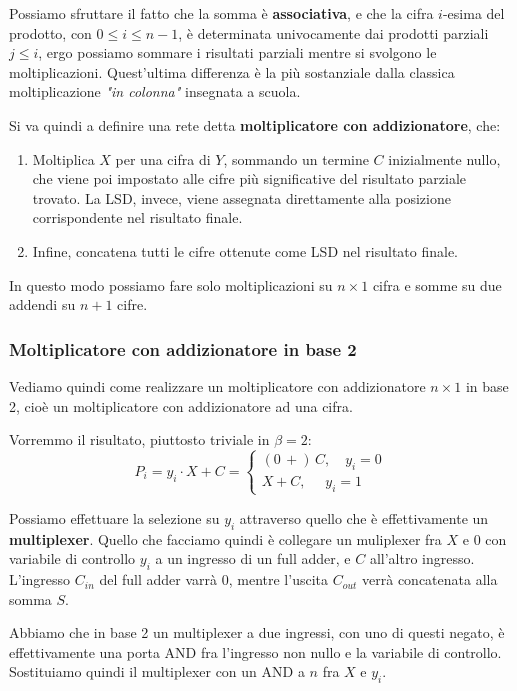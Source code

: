 \documentclass[a4paper,11pt]{article}
\begin{document}
Possiamo sfruttare il fatto che la somma è \textbf{associativa}, e che la cifra $i$-esima del prodotto, con $0 \leq i \leq n - 1$, è determinata univocamente dai prodotti parziali $j \leq i$, ergo possiamo sommare i risultati parziali mentre si svolgono le moltiplicazioni. 
Quest'ultima differenza è la più sostanziale dalla classica moltiplicazione \textit{"in colonna"} insegnata a scuola.

Si va quindi a definire una rete detta \textbf{moltiplicatore con addizionatore}, che:
\begin{enumerate}
	\item Moltiplica $X$ per una cifra di $Y$, sommando un termine $C$ inizialmente nullo, che viene poi impostato alle cifre più significative del risultato parziale trovato.
		La LSD, invece, viene assegnata direttamente alla posizione corrispondente nel risultato finale.
	\item Infine, concatena tutti le cifre ottenute come LSD nel risultato finale.
\end{enumerate}

In questo modo possiamo fare solo moltiplicazioni su $n \times 1$ cifra e somme su due addendi su $n+1$ cifre.

\subsubsection{Moltiplicatore con addizionatore in base 2}
Vediamo quindi come realizzare un moltiplicatore con addizionatore $n \times 1$ in base 2, cioè un moltiplicatore con addizionatore ad una cifra.

Vorremmo il risultato, piuttosto triviale in $\beta = 2$:
$$
P_i = y_i \cdot X + C =
	\begin{cases}
		(0 \, +) \, C, \quad y_i = 0 \\ 
		X + C, \quad \, \, y_i = 1
	\end{cases}
$$

Possiamo effettuare la selezione su $y_i$ attraverso quello che è effettivamente un \textbf{multiplexer}.
Quello che facciamo quindi è collegare un muliplexer fra $X$ e $0$ con variabile di controllo $y_i$ a un ingresso di un full adder, e $C$ all'altro ingresso.
L'ingresso $C_{in}$ del full adder varrà 0, mentre l'uscita $C_{out}$ verrà concatenata alla somma $S$.

Abbiamo che in base 2 un multiplexer a due ingressi, con uno di questi negato, è effettivamente una porta AND fra l'ingresso non nullo e la variabile di controllo.
Sostituiamo quindi il multiplexer con un AND a $n$ fra $X$ e $y_i$.
\end{document}
